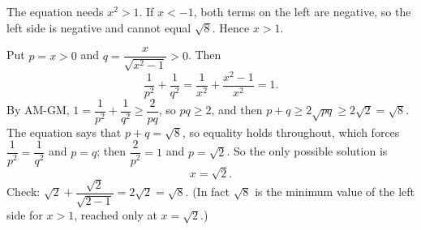 The equation needs $x^2>1$. If $x<-1$, both terms on the left are negative, so the left side is negative and cannot equal $\sqrt8$. Hence $x>1$.

Put $p=x>0$ and $q=\dfrac{x}{\sqrt{x^2-1}}>0$. Then
\[
\dfrac{1}{p^2}+\dfrac{1}{q^2}=\dfrac{1}{x^2}+\dfrac{x^2-1}{x^2}=1 .
\]
By AM-GM, $1=\dfrac{1}{p^2}+\dfrac{1}{q^2}\ge\dfrac{2}{pq}$, so $pq\ge2$, and then $p+q\ge2\sqrt{pq}\ge2\sqrt2=\sqrt8$. The equation says that $p+q=\sqrt8$, so equality holds throughout, which forces $\dfrac{1}{p^2}=\dfrac{1}{q^2}$ and $p=q$; then $\dfrac{2}{p^2}=1$ and $p=\sqrt2$. So the only possible solution is
\[
x=\boxed{\sqrt2}.
\]
Check: $\sqrt2+\dfrac{\sqrt2}{\sqrt{2-1}}=2\sqrt2=\sqrt8$. (In fact $\sqrt8$ is the minimum value of the left side for $x>1$, reached only at $x=\sqrt2$.)
